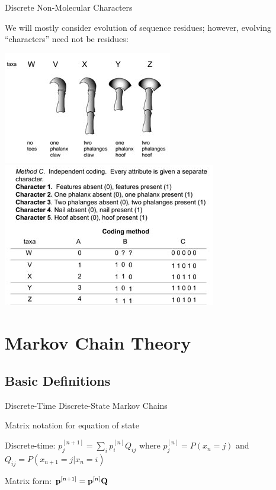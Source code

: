 \documentclass{beamer}
\begin{document}
\begin{frame}{Discrete Non-Molecular Characters}

We will mostly consider evolution of sequence residues; however, evolving ``characters'' need not be residues:

  \includegraphics[width=.5\textwidth]{claws.png}
  \includegraphics[width=.5\textwidth]{claws-coding.png}

\end{frame}

\section{Markov Chain Theory}

\subsection[Basic definitions]{Basic Definitions}

\begin{frame}{Discrete-Time Discrete-State Markov Chains}

\itemb
\item Matrix notation for equation of state
 \itemb
 \item Discrete-time: $p_j^{[n+1]} = \sum_i p_i^{[n]} Q_{ij}$ where $p_j^{[n]} = P(x_n=j)$ and $Q_{ij} = P(x_{n+1}=j|x_n=i)$
\pause
\pause
 \item Matrix form:   ${\bf p}^{[n+1]} = {\bf p}^{[n]} {\bf Q}$
 \iteme
\iteme

\end{frame}
\end{document}
